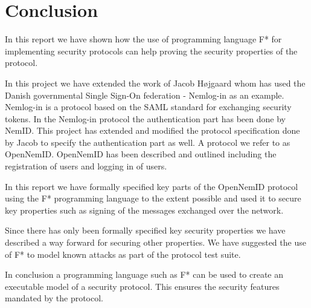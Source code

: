 \documentclass[twosided]{report}
\begin{document}
\section{Conclusion}
In this report we have shown how the use of programming language F*  for implementing security protocols can help proving the security properties of the protocol.
\par
In this project we have extended the work of Jacob H{\o}jgaard whom has used the Danish governmental Single Sign-On federation - Nemlog-in as an example. Nemlog-in is a protocol based on the SAML standard for exchanging security tokens. In the Nemlog-in protocol the authentication part has been done by NemID. This project has extended and modified the protocol specification done by Jacob to specify the authentication part as well. A protocol we refer to as OpenNemID. OpenNemID has been described and outlined including the registration of users and logging in of users.
\par
In this report we have formally specified key parts of the OpenNemID protocol using the F* programming language to the extent possible and used it to secure key properties such as signing of the messages exchanged over the network.
\par
Since there has only been formally specified key security properties we have described a way forward for securing other properties. We have suggested the use of F* to model known attacks as part of the protocol test suite.
\par
In conclusion a programming language such as F* can be used to create an executable model of a security protocol. This ensures the security features mandated by the protocol.
\end{document}
